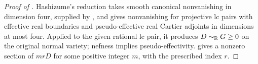 \begin{proof}[Proof of ]
Hashizume's reduction \cite[Theorem~1.4]{Hashizume2018} takes smooth
canonical nonvanishing in dimension four, supplied by
, and gives
nonvanishing for projective lc pairs with effective real boundaries
and pseudo-effective real Cartier adjoints in dimensions at most four.
Applied to the given rational lc pair, it produces $D\sim_{\mathbb R}G\ge0$
on the original normal variety; nefness implies pseudo-effectivity.
 gives a nonzero section of $mrD$
for some positive integer $m$, with the prescribed index $r$.
\end{proof}
